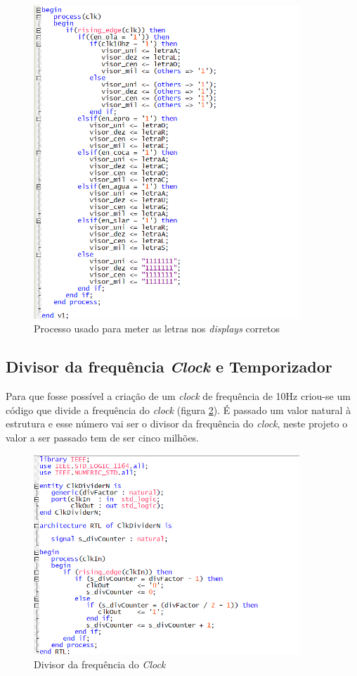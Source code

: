 \documentclass{report}
\begin{document}
\begin{figure}[H]
    \centering
    \includegraphics[width = 10cm]{Displayprocess.png}
    \caption{Processo usado para meter as letras nos \textit{displays} corretos}
    \label{fig:Displayprocess}
\end{figure}

\newpage

\subsection{Divisor da frequência \textit{Clock} e Temporizador}

Para que fosse possível a criação de um \textit{clock} de frequência de 10Hz criou-se um código que divide a frequência do \textit{clock} (figura \ref{fig:ClockDivider}). É passado um valor natural à estrutura e esse número vai ser o divisor da frequência do \textit{clock}, neste projeto o valor a ser passado tem de ser cinco milhões.

\begin{figure}[H]
    \centering
    \includegraphics[width = 10cm]{Clockdivider.png}
    \caption{Divisor da frequência do \textit{Clock}}
    \label{fig:ClockDivider}
\end{figure}
\end{document}

